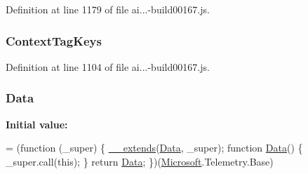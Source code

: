 Definition at line 1179 of file ai...-\/build00167.\+js.

\subsubsection[{\texorpdfstring{Context\+Tag\+Keys}{ContextTagKeys}}]{ Context\+Tag\+Keys}\hypertarget{_scripts_2ai_80_822_89-build00167_8js_a72ddf7ed435bb5a0f2826ad1a1f57735}{}\label{_scripts_2ai_80_822_89-build00167_8js_a72ddf7ed435bb5a0f2826ad1a1f57735}


Definition at line 1104 of file ai...-\/build00167.\+js.

\subsubsection[{\texorpdfstring{Data}{Data}}]{ Data}\hypertarget{_scripts_2ai_80_822_89-build00167_8js_a1c70ddbfa3627868ac58860850b66e52}{}\label{_scripts_2ai_80_822_89-build00167_8js_a1c70ddbfa3627868ac58860850b66e52}
{\bfseries Initial value\+:}
\begin{DoxyCode}
= (\textcolor{keyword}{function} (\_super) \{
            \hyperlink{obj_2_release_2_package_2_package_tmp_2_scripts_2ai_80_822_89-build00167_8js_ac09f4951ac4b25df0272d4e78ff85ae0}{\_\_extends}(\hyperlink{obj_2_release_2_package_2_package_tmp_2_scripts_2ai_80_822_89-build00167_8js_a1c70ddbfa3627868ac58860850b66e52}{Data}, \_super);
            \textcolor{keyword}{function} \hyperlink{obj_2_release_2_package_2_package_tmp_2_scripts_2ai_80_822_89-build00167_8js_a1c70ddbfa3627868ac58860850b66e52}{Data}() \{
                \_super.call(\textcolor{keyword}{this});
            \}
            \textcolor{keywordflow}{return} \hyperlink{obj_2_release_2_package_2_package_tmp_2_scripts_2ai_80_822_89-build00167_8js_a1c70ddbfa3627868ac58860850b66e52}{Data};
        \})(\hyperlink{obj_2_release_2_package_2_package_tmp_2_scripts_2ai_80_822_89-build00167_8js_af7b21097393c8dc2ece8949358ff0e27}{Microsoft}.Telemetry.Base)
\end{DoxyCode}


